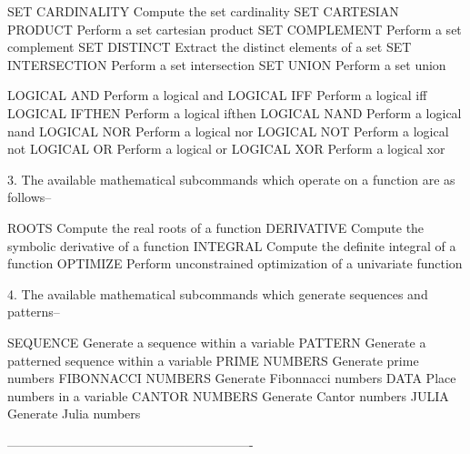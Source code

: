       SET CARDINALITY        Compute the set cardinality
      SET CARTESIAN PRODUCT  Perform a set cartesian product
      SET COMPLEMENT         Perform a set complement
      SET DISTINCT           Extract the distinct elements of a set
      SET INTERSECTION       Perform a set intersection
      SET UNION              Perform a set union
 
      LOGICAL AND            Perform a logical and
      LOGICAL IFF            Perform a logical iff
      LOGICAL IFTHEN         Perform a logical ifthen
      LOGICAL NAND           Perform a logical nand
      LOGICAL NOR            Perform a logical nor
      LOGICAL NOT            Perform a logical not
      LOGICAL OR             Perform a logical or
      LOGICAL XOR            Perform a logical xor
 
 
3. The available mathematical subcommands which operate on a function
   are as follows--
 
      ROOTS                  Compute the real roots of a function
      DERIVATIVE             Compute the symbolic derivative of a
                             function
      INTEGRAL               Compute the definite integral of a
                             function
      OPTIMIZE               Perform unconstrained optimization of a
                             univariate function
 
 
4. The available mathematical subcommands which generate sequences and
   patterns--
 
      SEQUENCE               Generate a sequence within a variable
      PATTERN                Generate a patterned sequence within a
                             variable
      PRIME NUMBERS          Generate prime numbers
      FIBONNACCI NUMBERS     Generate Fibonnacci numbers
      DATA                   Place numbers in a variable
      CANTOR NUMBERS         Generate Cantor numbers
      JULIA                  Generate Julia numbers
 
----------------------------------------------------------
 
 
 
 
 
 
 
 
 
 
 
 
 
 
 
 
 
 
 
 
 
 
 
